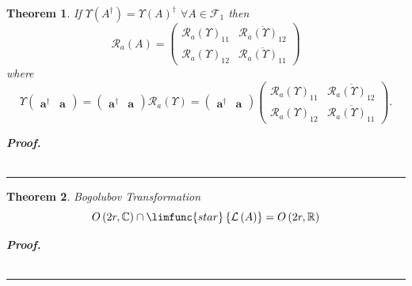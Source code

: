 \documentclass[aps,preprint]{revtex4}
\newtheorem{theorem}{Theorem}
\newenvironment{proof}[1][Proof]{\noindent\textbf{#1.} }{\ \rule{0.5em}{0.5em}}
\begin{document}
\begin{theorem}
If $\Upsilon \left( A^{\dagger }\right) =\Upsilon \left( A\right) ^{\dagger
} $ $\forall A\in \mathcal{F}_{1}$ then 
\begin{equation}
\mathcal{R}_{a}\left( A\right) =\left( 
\begin{array}{cc}
\mathcal{R}_{a}\left( \Upsilon \right) _{11} & \overline{\mathcal{R}%
_{a}\left( \Upsilon \right) _{12}} \\ 
\mathcal{R}_{a}\left( \Upsilon \right) _{12} & \overline{\mathcal{R}%
_{a}\left( \Upsilon \right) _{11}}%
\end{array}%
\right)
\end{equation}%
where 
\begin{equation}
\Upsilon \left( 
\begin{array}{cc}
\boldsymbol{a}^{\dagger } & \boldsymbol{a}%
\end{array}%
\right) =\left( 
\begin{array}{cc}
\boldsymbol{a}^{\dagger } & \boldsymbol{a}%
\end{array}%
\right) \mathcal{R}_{a}\left( \Upsilon \right) =\left( 
\begin{array}{cc}
\boldsymbol{a}^{\dagger } & \boldsymbol{a}%
\end{array}%
\right) \left( 
\begin{array}{cc}
\mathcal{R}_{a}\left( \Upsilon \right) _{11} & \overline{\mathcal{R}%
_{a}\left( \Upsilon \right) _{12}} \\ 
\mathcal{R}_{a}\left( \Upsilon \right) _{12} & \overline{\mathcal{R}%
_{a}\left( \Upsilon \right) _{11}}%
\end{array}%
\right) .
\end{equation}

\begin{proof}
\begin{equation}
\end{equation}
\end{proof}
\end{theorem}

\begin{theorem}
Bogolubov Transformation \label{Bogolubov Transformation Theorem} 
\begin{equation}
O\left( 2r,\mathbb{C}\right) \cap \limfunc{star}\left\{ \mathcal{L}\left(
A\right) \right\} =O\left( 2r,\mathbb{R}\right)
\end{equation}

\begin{proof}
\begin{equation}
\end{equation}
\end{proof}
\end{theorem}
\end{document}
